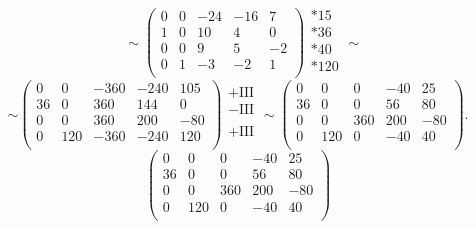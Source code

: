 \begin{enumerate}
\[\begin{array}{c}
			      \\
		      \end{array}
		      \sim
		      \begin{pmatrix}
			      0 & 0 & -24 & -16 & 7  \\
			      1 & 0 & 10  & 4   & 0  \\
			      0 & 0 & 9   & 5   & -2 \\
			      0 & 1 & -3  & -2  & 1  \\
		      \end{pmatrix}
		      \begin{array}{c}
			      *15  \\
			      *36  \\
			      *40  \\
			      *120 \\
		      \end{array}
		      \sim
	      \]
	      \[
		      \sim
		      \begin{pmatrix}
			      0  & 0   & -360 & -240 & 105 \\
			      36 & 0   & 360  & 144  & 0   \\
			      0  & 0   & 360  & 200  & -80 \\
			      0  & 120 & -360 & -240 & 120 \\
		      \end{pmatrix}
		      \begin{array}{c}
			      +\text{III} \\
			      -\text{III} \\
			      \\
			      +\text{III} \\
		      \end{array}
		      \sim
		      \begin{pmatrix}
			      0  & 0   & 0   & -40 & 25  \\
			      36 & 0   & 0   & 56  & 80  \\
			      0  & 0   & 360 & 200 & -80 \\
			      0  & 120 & 0   & -40 & 40  \\
		      \end{pmatrix}.
	      \]
	      \[
		      \begin{pmatrix}
			      0  & 0   & 0   & -40 & 25  \\
			      36 & 0   & 0   & 56  & 80  \\
			      0  & 0   & 360 & 200 & -80 \\
			      0  & 120 & 0   & -40 & 40  \\

\end{pmatrix}\]
\end{enumerate}
